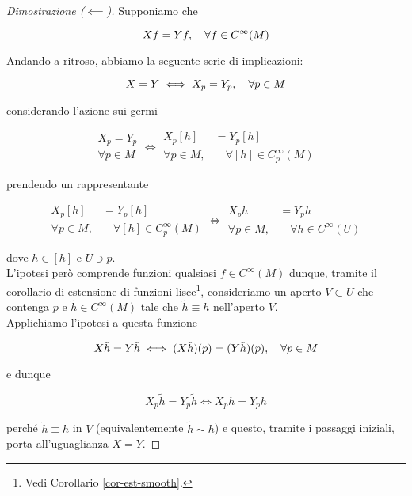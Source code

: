 \begin{proof}[Dimostrazione ($ \impliedby $)]
	Supponiamo che
	
	\begin{equation}
		X f = Y f  \qcomma \forall f \in C^{\infty}(M)
	\end{equation}
	
	Andando a ritroso, abbiamo la seguente serie di implicazioni:
	
	\begin{equation}
		X = Y \iff X_{p} = Y_{p} \qcomma \forall p \in M
	\end{equation}

	considerando l'azione sui germi
	
	\begin{equation}
		\begin{aligned}
			X_{p} = Y_{p} \\
			\forall p \in M
		\end{aligned} %
		 \iff %
		 \begin{aligned}
			 X_{p} [h] &= Y_{p} [h] \\
			 \forall p \in M,& \quad \forall [h] \in C_{p}^{\infty}(M)
		 \end{aligned}
	\end{equation}

	prendendo un rappresentante
	
	\begin{equation}
		\begin{aligned}
			X_{p} [h] &= Y_{p} [h] \\
			\forall p \in M,& \quad \forall [h] \in C_{p}^{\infty}(M)
		\end{aligned}%
		\iff %
		\begin{aligned}
			X_{p} h &= Y_{p} h \\
			\forall p \in M,& \quad \forall h \in C^{\infty}(U)
		\end{aligned}
	\end{equation}
	
	dove $ h \in [h] $ e $ U \ni p $.\\
	L'ipotesi però comprende funzioni qualsiasi $ f \in C^{\infty}(M) $ dunque, tramite il corollario di estensione di funzioni lisce\footnote{%
		Vedi Corollario \ref{cor-est-smooth}.%
	}, consideriamo un aperto $ V \subset U $ che contenga $ p $ e $ \tilde{h} \in C^{\infty}(M) $ tale che $ \tilde{h} \equiv h $ nell'aperto $ V $.\\
	Applichiamo l'ipotesi a questa funzione
	
	\begin{equation}
		X \tilde{h} = Y \tilde{h} \iff (X \tilde{h})(p) = (Y \tilde{h})(p) \qcomma \forall p \in M
	\end{equation}

	e dunque
	
	\begin{equation}
		X_{p} \tilde{h} = Y_{p} \tilde{h} \iff X_{p} h = Y_{p} h
	\end{equation}

	perché $ \tilde{h} \equiv h $ in $ V $ (equivalentemente $ \tilde{h} \sim h $) e questo, tramite i passaggi iniziali, porta all'uguaglianza $ X = Y $.
\end{proof}

